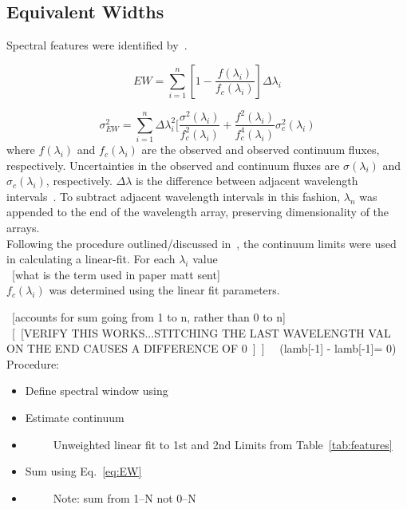 \subsection{Equivalent Widths}


Spectral features were identified by~\cite{Rayner_2009}.  


\begin{equation}\label{eq:EW}
	EW = \sum_{i=1}^{n} [1 - \frac{f(\lambda_{i})}{f_{c}(\lambda_{i})}] \Delta\lambda_{i}
\end{equation}

\begin{equation}\label{eq:EWvar}
	\sigma_{EW}^{2} = \sum_{i=1}^{n} \Delta\lambda_{i}^{2} [\frac{\sigma^{2}(\lambda_{i})}{f_{c}^{2}(\lambda_{i})} + \frac{f^{2}(\lambda_{i})}{f_{c}^{4}(\lambda_{i})}\sigma_{c}^{2}(\lambda_{i})
\end{equation}
where $f(\lambda_{i})$ and $f_{c}(\lambda_{i})$ are the observed 
and observed continuum fluxes, respectively.  Uncertainties in the 
observed and continuum fluxes are $\sigma(\lambda_{i})$ and 
$\sigma_{c}(\lambda_{i})$, respectively.  $\Delta\lambda$ is the 
difference between adjacent wavelength intervals~\cite{Sembach_1992}.
To subtract adjacent wavelength intervals in this fashion, $\lambda_{n}$ was appended to the end of the wavelength array, preserving dimensionality of the arrays.\\


Following the procedure outlined/discussed in~\cite{Cushing_2005}, the continuum limits were used in calculating a linear-fit.  For each $\lambda_{i}$ value\\
~[what is the term used in paper matt sent]\\
$f_{c}(\lambda_{i})$ was determined using the linear fit parameters.
 

~[accounts for sum going from 1 to n, rather than 0 to n]\\
~[~[VERIFY THIS WORKS...STITCHING THE LAST WAVELENGTH VAL ON THE END CAUSES A DIFFERENCE OF 0~]~] ~~(lamb[-1] - lamb[-1]= 0)\\






Procedure:\\
\begin{itemize}
	\item{} Define spectral window using
	\item{} Estimate continuum
	\item{}~~~~~Unweighted linear fit to 1st and 2nd Limits from Table~\ref{tab:features}
	\item{} Sum using Eq.~\ref{eq:EW}
	\item{}~~~~~Note: sum from 1--N not 0--N
\end{itemize}




